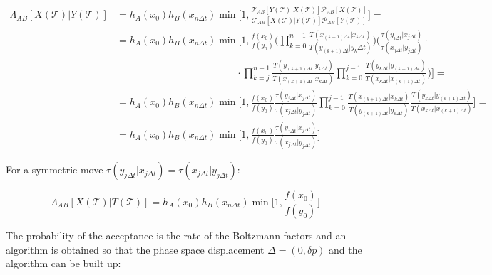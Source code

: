 	\begin{align*}
		\Lambda_{AB}[X(\mathcal{T})|Y(\mathcal{T})] &= h_A(x_0)h_B(x_{n\Delta t})\min\biggl[1, \frac{\mathcal{T}_{AB}[Y(\mathcal{T})|X(\mathcal{T})]\mathcal{P}_{AB}[X(\mathcal{T})]}{\mathcal{T}_{AB}[X(\mathcal{T})|Y(\mathcal{T})]\mathcal{P}_{AB}[Y(\mathcal{T})]}\biggr] = \\
																								&= h_A(x_0)h_B(x_{n\Delta t})\min\biggl[1, \frac{f(x_0)}{f(y_0)}\biggl(\prod\limits_{k=0}^{n-1}\frac{T(x_{(k+1)\Delta t}|x_{k\Delta t})}{T(y_{(k+1)\Delta t}|y_k\Delta t)}\biggr)\biggl(\frac{\tau(y_{i\Delta t}|x_{j\Delta t})}{\tau(x_{j\Delta t}|y_{j\Delta t})}\cdot\\
																								&\qquad\qquad\qquad\qquad\qquad\qquad\cdot\prod\limits_{k=j}^{n-1}\frac{T(y_{(k+1)\Delta t}|y_{k\Delta t})}{T(x_{(k+1)\Delta t}|x_{k\Delta t})}\prod\limits_{k=0}^{j-1}\frac{T(y_{k\Delta t}|y_{(k+1)\Delta t})}{T(x_{k\Delta t}|x_{(k+1)\Delta t})}\biggr)\biggr] = \\
																								&=h_A(x_0)h_B(x_{n\Delta t})\min\biggl[1, \frac{f(x_0)}{f(y_0)}\frac{\tau(y_{j\Delta t}|x_{j\Delta t})}{\tau(x_{j\Delta t}|y_{j\Delta t})}\prod\limits_{k=0}^{j-1}\frac{T(x_{(k+1)\Delta t}|x_{k\Delta t})}{T(y_{(k+1)\Delta t}|y_{k\Delta t})}\frac{T(y_{k\Delta t}|y_{(k+1)\Delta t})}{T(x_{k\Delta t}|x_{(k+1)\Delta t})}\biggr]=\\
																								& = h_A(x_0)h_B(x_{n\Delta t})\min\biggl[1, \frac{f(x_0)}{f(y_0)}\frac{\tau(y_{j\Delta t}|x_{j\Delta t})}{\tau(x_{j\Delta t}|y_{j\Delta t})}\biggr]
	\end{align*}

	For a symmetric move $\tau(y_{j\Delta t}|x_{j\Delta t}) = \tau(x_{j\Delta t}|y_{j\Delta t})$:

	$$\Lambda_{AB}[X(\mathcal{T})|T(\mathcal{T})] = h_A(x_0)h_B(x_{n\Delta t})\min\biggl[1, \frac{f(x_0)}{f(y_0)}\biggr]$$

	The probability of the acceptance is the rate of the Boltzmann factors and an algorithm is obtained so that the phase space displacement $\Delta = (0, \delta p)$ and the algorithm can be built up:

